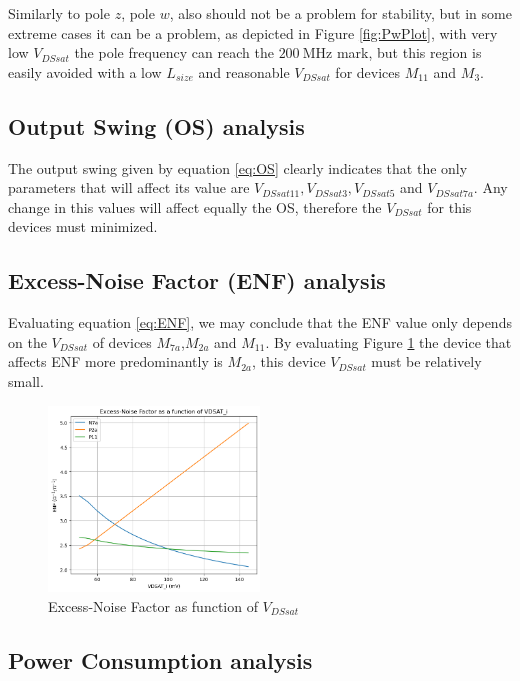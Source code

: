 Similarly to pole $z$, pole $w$, also should not be a problem for stability, but in some extreme cases it can be a problem, as depicted in Figure \ref{fig:PwPlot}, with very low $V_{DSsat}$ the pole frequency can reach the $\SI{200}{\mega\hertz}$ mark, but this region is easily avoided with a low $L_{size}$ and reasonable $V_{DSsat}$ for devices $M_{11}$ and $M_3$.
\pagebreak
\subsection{Output Swing (OS) analysis}


The output swing given by equation \ref{eq:OS} clearly indicates that the only parameters that will affect its value are $V_{DSsat11}, V_{DSsat3}, V_{DSsat5}$ and $V_{DSsat7a}$. Any change in this values will affect equally the OS, therefore the $V_{DSsat}$ for this devices must minimized.


\subsection{Excess-Noise Factor (ENF) analysis}

Evaluating equation \ref{eq:ENF}, we may conclude that the ENF value only depends on the $V_{DSsat}$ of devices $M_{7a}$,$M_{2a}$ and $M_{11}$. By evaluating Figure \ref{fig:enfVariation} the device that affects ENF more predominantly is $M_{2a}$, this device $V_{DSsat}$ must be relatively small.

\begin{figure}[H]
    \centering
    \includegraphics[width=0.5\textwidth]{Images/enfVariation.png}
    \caption{Excess-Noise Factor as function of $V_{DSsat}$}
    \label{fig:enfVariation}
\end{figure}

\subsection{Power Consumption analysis}


